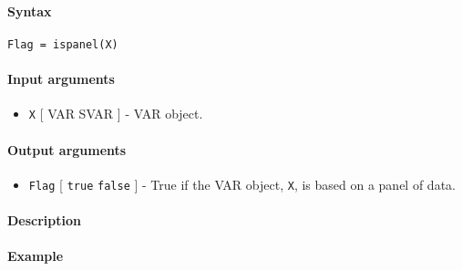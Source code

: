


	\paragraph{Syntax}

\begin{verbatim}
Flag = ispanel(X)
\end{verbatim}

\paragraph{Input arguments}

\begin{itemize}
\itemsep1pt\parskip0pt
\item
  \texttt{X} {[} VAR \textbar{} SVAR {]} - VAR object.
\end{itemize}

\paragraph{Output arguments}

\begin{itemize}
\itemsep1pt\parskip0pt
\item
  \texttt{Flag} {[} \texttt{true} \textbar{} \texttt{false} {]} - True
  if the VAR object, \texttt{X}, is based on a panel of data.
\end{itemize}

\paragraph{Description}

\paragraph{Example}


